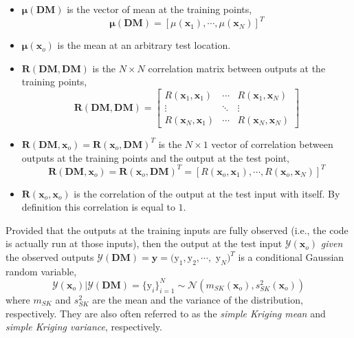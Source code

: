 \begin{itemize}

	\item $\boldsymbol{\mu}(\mathbf{DM})$ is the vector of mean at the training points,
		\begin{equation}
			\boldsymbol{\mu}(\mathbf{DM}) = [\mu(\mathbf{x}_1), \cdots, \mu(\mathbf{x}_N)]^T 
		\label{eq:training_mean_vector}
		\end{equation}

	\item $\boldsymbol{\mu}(\bm{x}_o)$ is the mean at an arbitrary test location.

	\item $\mathbf{R}(\mathbf{DM}, \mathbf{DM})$ is the $N \times N$ correlation matrix between outputs at the training points,
		\begin{equation}
			\mathbf{R}(\mathbf{DM}, \mathbf{DM}) = 
				\begin{bmatrix}
					R(\mathbf{x}_1, \mathbf{x}_1)	& \cdots		& R(\mathbf{x}_1, \mathbf{x}_N) \\
					\vdots												& \ddots		&	\vdots \\
					R(\mathbf{x}_N, \mathbf{x}_1)	&	\cdots    & R(\mathbf{x}_N, \mathbf{x}_N)
				\end{bmatrix}
		\label{eq:training_correlation_matrix}
		\end{equation}

	\item $\mathbf{R}(\mathbf{DM}, \bm{x}_o) = \mathbf{R}(\bm{x}_o, \mathbf{DM})^T$ is the $N \times 1$ vector of correlation between outputs at the training points and the output at the test point,
			\begin{equation}
				\mathbf{R}(\mathbf{DM}, \bm{x}_o) = \mathbf{R}(\bm{x}_o, \mathbf{DM})^T =  [R(\bm{x}_o, \mathbf{x}_1), \cdots, R(\bm{x}_o, \mathbf{x}_N)]^T
			\label{eq:training_test_correlation}
			\end{equation}
		
		\item $\mathbf{R}(\bm{x}_o, \bm{x}_o)$ is the correlation of the output at the test input with itself. By definition this correlation is equal to $1$.

\end{itemize}

Provided that the outputs at the training inputs are fully observed (i.e., the code is actually run at those inputs),
then the output at the test input $\mathcal{Y}(\bm{x}_o)$ \emph{given} the observed outputs $\mathcal{Y}(\mathbf{DM}) = \mathbf{y} = (\text{y}_1, \text{y}_2, \cdots,$ 
$\text{y}_N)^T$ is a conditional Gaussian random variable,
\begin{equation}
	\mathcal{Y}(\mathbf{x}_o) | \mathcal{Y}(\mathbf{DM}) = \{\text{y}_i\}_{i=1}^N \sim \mathcal{N} \left( m_{SK}(\bm{x}_o), s^2_{SK}(\bm{x}_o)\right)
\label{eq:conditional_training_test}
\end{equation}
where $m_{SK}$ and $s^2_{SK}$ are the mean and the variance of the distribution, respectively.
They are also often referred to as the \emph{simple Kriging mean} and \emph{simple Kriging variance}, respectively.

